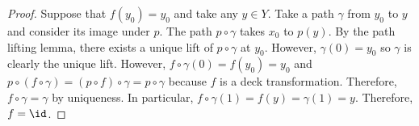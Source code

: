 \documentclass[12pt]{extarticle}
\begin{document}
\begin{proof}
Suppose that $f(y_0) = y_0$ and take any $y \in Y$. Take a path $\gamma$ from $y_0$ to $y$ and consider its image under $p$. The path $p \circ \gamma$ takes $x_0$ to $p(y)$. By the path lifting lemma, there exists a unique lift of $p \circ \gamma$ at $y_0$. However, $\gamma(0) = y_0$ so $\gamma$ is clearly the unique lift. However, $f \circ \gamma(0) = f(y_0) = y_0$ and $p \circ (f \circ \gamma) = (p \circ f) \circ \gamma = p \circ \gamma$ because $f$ is a deck transformation. Therefore, $f \circ \gamma = \gamma$ by uniqueness. In particular, $f \circ \gamma(1) = f(y) = \gamma(1) = y$. Therefore, $f = \id$.    
\end{proof}
\end{document}
